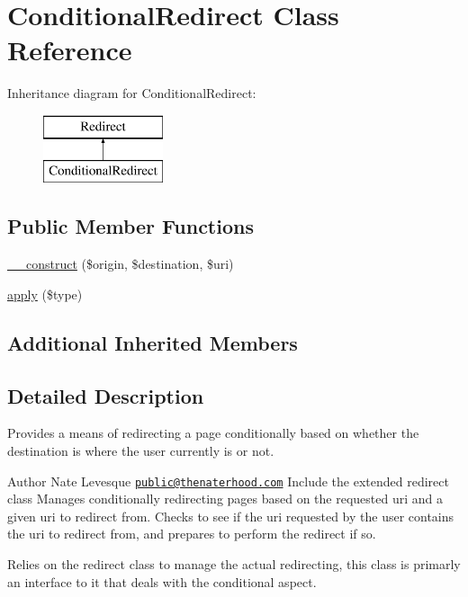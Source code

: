 \hypertarget{classConditionalRedirect}{\section{Conditional\-Redirect Class Reference}
\label{classConditionalRedirect}
}
Inheritance diagram for Conditional\-Redirect\-:\begin{figure}[H]
\begin{center}
\leavevmode
\includegraphics[height=2.000000cm]{classConditionalRedirect}
\end{center}
\end{figure}
\subsection*{Public Member Functions}
\begin{DoxyCompactItemize}
\item 
\hyperlink{classConditionalRedirect_ab71462022fa9e166aea7d7f6f7ece689}{\-\_\-\-\_\-construct} (\$origin, \$destination, \$uri)
\item 
\hyperlink{classConditionalRedirect_a20b8041caca16a9d7c6d9fe07ec17a0d}{apply} (\$type)
\end{DoxyCompactItemize}
\subsection*{Additional Inherited Members}


\subsection{Detailed Description}
Provides a means of redirecting a page conditionally based on whether the destination is where the user currently is or not. \begin{DoxyAuthor}{Author}
Nate Levesque \href{mailto:public@thenaterhood.com}{\tt public@thenaterhood.\-com} Include the extended redirect class Manages conditionally redirecting pages based on the requested uri and a given uri to redirect from. Checks to see if the uri requested by the user contains the uri to redirect from, and prepares to perform the redirect if so.
\end{DoxyAuthor}
Relies on the redirect class to manage the actual redirecting, this class is primarly an interface to it that deals with the conditional aspect. 

